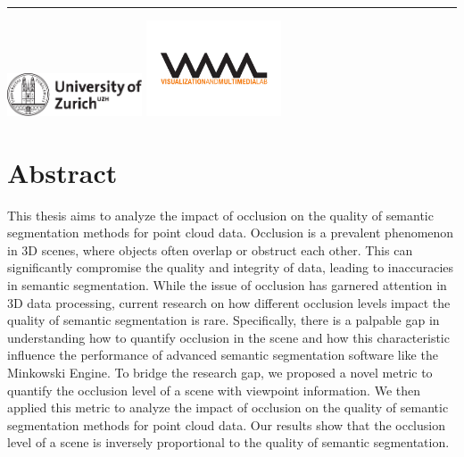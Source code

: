 \documentclass[11pt, a4paper,oneside,chapterprefix=false]{scrbook}
\newcommand{\FIXME}[1]{{\color{RED}{\textbf{FIX}: #1}}}
\begin{document}
\begin{titlepage}
	\vfill
	\hrule
	\vspace{0.5cm}
	\includegraphics*[width=0.3\textwidth]{figures/uzh_logo} \hfill
	\includegraphics*[width=0.3\textwidth]{figures/vmml_logo}
\end{titlepage}

\chapter{Abstract} \label{chp:abstract}

This thesis aims to analyze the impact of occlusion on the quality of semantic segmentation methods for point cloud data. Occlusion is a prevalent phenomenon in 3D scenes, where objects often overlap or obstruct each other. This can significantly compromise the quality and integrity of data, leading to inaccuracies in semantic segmentation. While the issue of occlusion has garnered attention in 3D data processing, current research on how different occlusion levels impact the quality of semantic segmentation is rare. Specifically, there is a palpable gap in understanding how to quantify occlusion in the scene and how this characteristic influence the performance of advanced semantic segmentation software like the Minkowski Engine. To bridge the research gap, we proposed a novel metric to quantify the occlusion level of a scene with viewpoint information. We then applied this metric to analyze the impact of occlusion on the quality of semantic segmentation methods for point cloud data. Our results show that the occlusion level of a scene \FIXME{not inverse} is inversely proportional to the quality of semantic segmentation.

\tableofcontents

\listoffigures

\lstlistoflistings

\mainmatter

\end{document}
